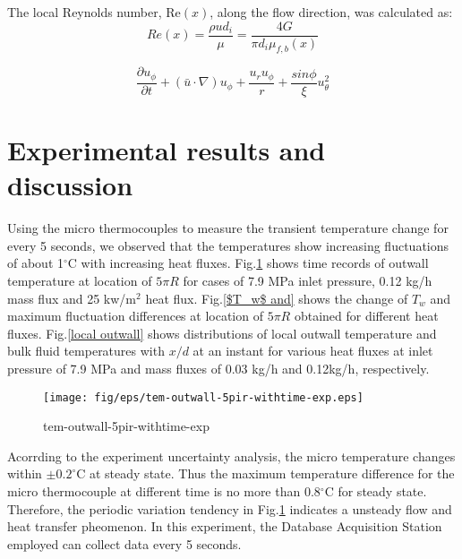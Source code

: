 \documentclass[a4paper,12pt]{article}
\begin{document}
The local Reynolds number, Re$(x)$, along the flow direction, was calculated as:
\begin{equation}\label{Re(x)}
Re(x)=\frac{\rho ud_i}{\mu}=\frac{4G}{\pi d_i\mu_{f,b}(x)}
\end{equation}

\begin{equation}
	\frac{\partial u_\phi}{\partial t} + (\bar{u}\cdot \nabla)u_\phi + \frac{u_ru_\phi}{r} + \frac{sin \phi}{\xi}u_\theta^2 
\end{equation}

\section{Experimental results and discussion}

Using the micro thermocouples to measure the transient temperature change for every 5 seconds, we observed that the temperatures show increasing fluctuations of about 1$^{\circ}$C with increasing heat fluxes. Fig.\ref{tem-outwall} shows  time records of outwall temperature at location of $5\pi R$ for cases of 7.9 MPa inlet pressure, 0.12 kg/h mass flux and 25 kw/m$^2$ heat flux. Fig.\ref{$T_w$ and} shows the change of $T_w$ and maximum fluctuation differences at location of $5\pi R$ obtained for different heat fluxes. Fig.\ref{local outwall} shows distributions of local outwall temperature and bulk fluid temperatures with $x/d$ at an instant for various heat fluxes at inlet pressure of 7.9 MPa and mass fluxes of 0.03 kg/h and 0.12kg/h, respectively.

\begin{figure}
	\centering
	\texttt{[image: fig/eps/tem-outwall-5pir-withtime-exp.eps]}
	\caption{tem-outwall-5pir-withtime-exp}\label{tem-outwall}
\end{figure}

Acorrding to the experiment uncertainty analysis, the micro temperature changes within $\pm 0.2^{\circ}$C at steady state. Thus the maximum temperature difference for the micro thermocouple at different time is no more than 0.8$^{\circ}$C for steady state. Therefore, the periodic variation tendency in Fig.\ref{tem-outwall} indicates a unsteady flow and heat transfer pheomenon. In this experiment, the Database Acquisition Station employed can collect data every 5 seconds.
\end{document}
